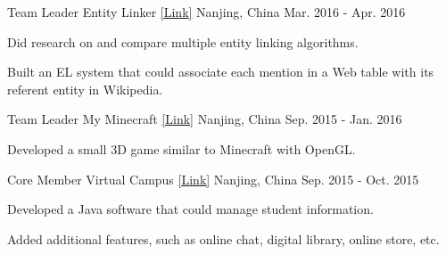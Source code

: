 \begin{cventries}
  \cventry
    {Team Leader} %
    {Entity Linker \href{https://github.com/acmom/entity-linker}{[\underline{Link}]}} %
    {Nanjing, China} %
    {Mar. 2016 - Apr. 2016} %
    {
      \begin{cvitems} %
        \item {Did research on and compare multiple entity linking algorithms.}
        \item {Built an EL system that could associate each mention in a Web table with its referent entity in Wikipedia.}
      \end{cvitems}
    }

  \cventry
    {Team Leader} %
    {My Minecraft \href{https://github.com/yanshengjia/openGL/tree/master/lab5}{[\underline{Link}]}} %
    {Nanjing, China} %
    {Sep. 2015 - Jan. 2016} %
    {
      \begin{cvitems} %
        \item {Developed a small 3D game similar to Minecraft with OpenGL.}
      \end{cvitems}
    }


  \cventry
    {Core Member} %
    {Virtual Campus \href{https://github.com/acmom/vcampus}{[\underline{Link}]}} %
    {Nanjing, China} %
    {Sep. 2015 - Oct. 2015} %
    {
      \begin{cvitems} %
        \item {Developed a Java software that could manage student information.}
        \item {Added additional features, such as online chat, digital library, online store, etc.}
      \end{cvitems}
    }

\end{cventries}
